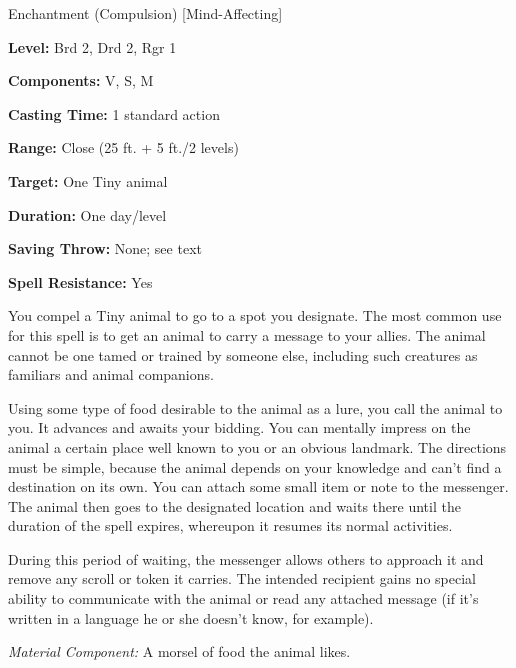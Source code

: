 
Enchantment (Compulsion) [Mind-Affecting]

\textbf{Level:} Brd 2, Drd 2, Rgr 1

\textbf{Components:} V, S, M

\textbf{Casting Time:} 1 standard action

\textbf{Range:} Close (25 ft. + 5 ft./2 levels)

\textbf{Target:} One Tiny animal

\textbf{Duration:} One day/level

\textbf{Saving Throw:} None; see text

\textbf{Spell Resistance:} Yes

You compel a Tiny animal to go to a spot you designate. The most common use for 
this spell is to get an animal to carry a message to your allies. The animal cannot 
be one tamed or trained by someone else, including such creatures as familiars 
and animal companions.

Using some type of food desirable to the animal as a lure, you call the animal 
to you. It advances and awaits your bidding. You can mentally impress on the animal 
a certain place well known to you or an obvious landmark. The directions must be 
simple, because the animal depends on your knowledge and can't find a destination 
on its own. You can attach some small item or note to the messenger. The animal 
then goes to the designated location and waits there until the duration of the 
spell expires, whereupon it resumes its normal activities.

During this period of waiting, the messenger allows others to approach it and remove 
any scroll or token it carries. The intended recipient gains no special ability 
to communicate with the animal or read any attached message (if it's written in 
a language he or she doesn't know, for example).

\textit{Material Component:} A morsel of food the animal likes.

